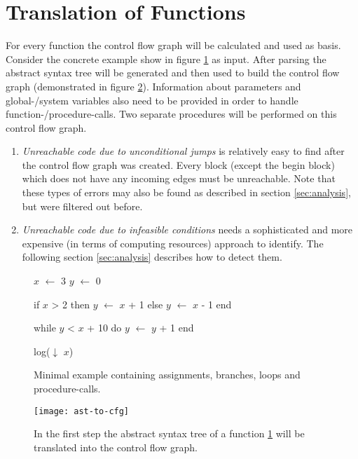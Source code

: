 \section{Translation of Functions}
\label{sec:translation}
For every function the control flow graph will be calculated and used as basis. 
Consider the concrete example show in figure \ref{code:transformation example} as input. 
After parsing the abstract syntax tree will be generated and then used to build the control flow graph (demonstrated in figure \ref{fig:ast to cfg}).
Information about parameters and global-/system variables also need to be provided in order to handle function-/procedure-calls. 
Two separate procedures will be performed on this control flow graph.
\begin{enumerate}
	\item \emph{Unreachable code due to unconditional jumps} is relatively easy to find after the control flow graph was created. Every block (except the begin block) which does not have any incoming edges must be unreachable.
	Note that these types of errors may also be found as described in section \ref{sec:analysis}, but were filtered out before.
	\item \emph{Unreachable code due to infeasible conditions} needs a sophisticated and more expensive (in terms of computing resources) approach to identify. The following section \ref{sec:analysis} describes how to detect them.
\end{enumerate}

\begin{figure}[h!]
	\begin{GenericCode}
		$x$ $\leftarrow$ 3
		$y$ $\leftarrow$ 0
		
		if $x$ > 2 then
			$y$ $\leftarrow$ $x$ + 1
		else
			$y$ $\leftarrow$ $x$ - 1
		end
		
		while $y$ < $x$ + 10 do
			$y$ $\leftarrow$ $y$ + 1
		end
		
		log($\downarrow$ $x$)
	\end{GenericCode}
	\caption{Minimal example containing assignments, branches, loops and procedure-calls. }
	\label{code:transformation example}
\end{figure}

\begin{figure}[h!]
	\centering
	\texttt{[image: ast-to-cfg]}
	\caption{In the first step the abstract syntax tree of a function \ref{code:transformation example} will be translated into the control flow graph.}
	\label{fig:ast to cfg}
\end{figure}


